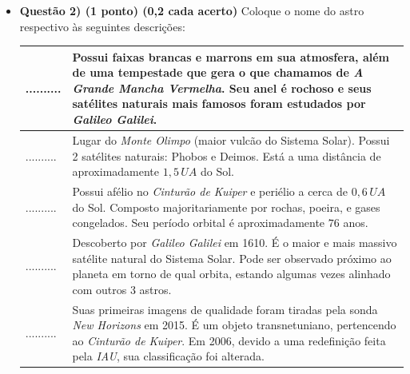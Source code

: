 \documentclass[a4paper, 12pt]{article}
\begin{document}
\begin{itemize}
		\item \textbf{Questão 2) (1 ponto) (0,2 cada acerto)} Coloque o nome do astro respectivo às seguintes descrições:
			\begin{center} \begin{tabular}{|M{0.2\textwidth}|M{0.65\textwidth}|}
				\hline
				.......... & Possui faixas brancas e marrons em sua atmosfera, além de uma tempestade que gera o que chamamos de \textit{A Grande Mancha Vermelha}. Seu anel é rochoso e seus satélites naturais mais famosos foram estudados por \textit{Galileo Galilei}. \\ \hline
				.......... & Lugar do \textit{Monte Olimpo} (maior vulcão do Sistema Solar). Possui 2 satélites naturais: Phobos e Deimos. Está a uma distância de aproximadamente $1,5 \, UA$ do Sol. \\ \hline
				.......... & Possui afélio no \textit{Cinturão de Kuiper} e periélio a cerca de $0,6 \, UA$ do Sol. Composto majoritariamente por rochas, poeira, e gases congelados. Seu período orbital é aproximadamente $76$ anos. \\ \hline
				.......... & Descoberto por \textit{Galileo Galilei} em 1610. É o maior e mais massivo satélite natural do Sistema Solar. Pode ser observado próximo ao planeta em torno de qual orbita, estando algumas vezes alinhado com outros 3 astros.  \\ \hline
				.......... & Suas primeiras imagens de qualidade foram tiradas pela sonda \textit{New Horizons} em 2015. É um objeto transnetuniano, pertencendo ao \textit{Cinturão de Kuiper}. Em 2006, devido a uma redefinição feita pela \textit{IAU}, sua classificação foi alterada. \\ \hline
			\end{tabular} \end{center}
		

\end{itemize}
\end{document}
